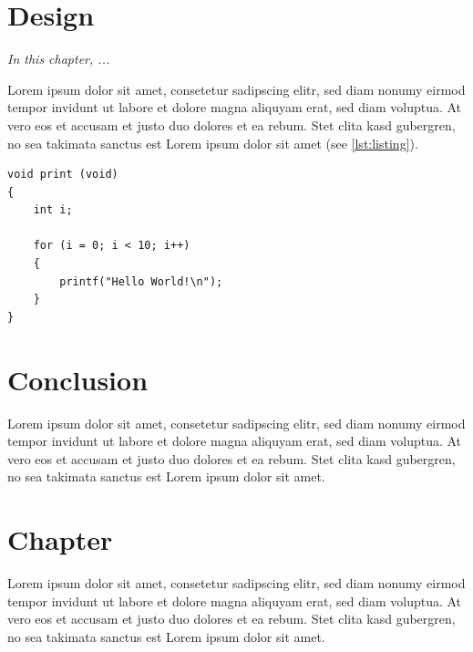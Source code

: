\documentclass[
	12pt,
	a4paper,
	BCOR10mm,
	DIV14,
	headsepline,
]{scrreprt}
\begin{document}
\chapter{Design}
\label{Design}

\textit{%
In this chapter, ...
}

\bigskip

Lorem ipsum dolor sit amet, consetetur sadipscing elitr, sed diam nonumy eirmod tempor invidunt ut labore et dolore magna aliquyam erat, sed diam voluptua.
At vero eos et accusam et justo duo dolores et ea rebum.
Stet clita kasd gubergren, no sea takimata sanctus est Lorem ipsum dolor sit amet (see \cref{lst:listing}).

\begin{lstlisting}[caption=Example listing, label={lst:listing}]
void print (void)
{
	int i;

	for (i = 0; i < 10; i++)
	{
		printf("Hello World!\n");
	}
}
\end{lstlisting}

\chapter{Conclusion}
\label{Conclusion}

Lorem ipsum dolor sit amet, consetetur sadipscing elitr, sed diam nonumy eirmod tempor invidunt ut labore et dolore magna aliquyam erat, sed diam voluptua.
At vero eos et accusam et justo duo dolores et ea rebum.
Stet clita kasd gubergren, no sea takimata sanctus est Lorem ipsum dolor sit amet.




\appendix
\appendixpage

\chapter{Chapter}

Lorem ipsum dolor sit amet, consetetur sadipscing elitr, sed diam nonumy eirmod tempor invidunt ut labore et dolore magna aliquyam erat, sed diam voluptua.
At vero eos et accusam et justo duo dolores et ea rebum.
Stet clita kasd gubergren, no sea takimata sanctus est Lorem ipsum dolor sit amet.

\listoffigures

\lstlistoflistings

\listoftables

\chapter*{}
\end{document}
